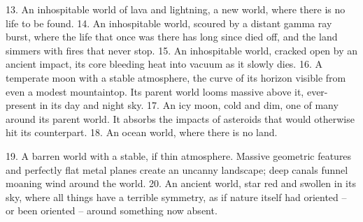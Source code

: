      13. An inhospitable world of lava and lightning, a new world, where there is no life to be found.  
     14. An inhospitable world, scoured by a distant gamma ray burst, where the life that once was  
         there has long since died off, and the land simmers with fires that never stop.   
     15. An inhospitable world, cracked open by an ancient impact, its core bleeding heat into  
         vacuum as it slowly dies.    
     16. A temperate moon with a stable atmosphere, the curve of its horizon visible from even a  
         modest mountaintop. Its parent world looms massive above it, ever-present in its day and  
         night sky.   
     17. An icy moon, cold and dim, one of many around its parent world. It absorbs the impacts of  
         asteroids that would otherwise hit its counterpart.   
     18. An ocean world, where there is no land.  

                                                                                                                 


    19. A barren world with a stable, if thin atmosphere. Massive geometric features and perfectly  
        flat metal planes create an uncanny landscape; deep canals funnel moaning wind around  
        the world.   
    20. An ancient world, star red and swollen in its sky, where all things have a terrible symmetry,  
        as if nature itself had oriented -- or been oriented -- around something now absent.   

